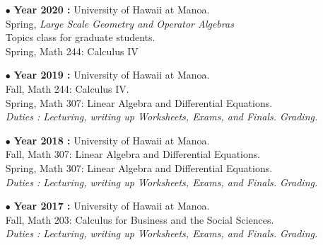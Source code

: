 \documentclass[a4paper,11pt]{article}
\begin{document}
\begin{itemize}

\item[$\bullet$] \textbf{ Year 2020 :} University of Hawaii at Manoa.\\
				Spring, \textit{Large Scale Geometry and Operator Algebras}\\
				Topics class for graduate students.\\
				Spring, Math 244: Calculus IV\\
\item[$\bullet$] \textbf{ Year 2019 :} University of Hawaii at Manoa.\\
					Fall, Math 244: Calculus IV.\\
					Spring, Math 307: Linear Algebra and Differential Equations.\\
					\textit{Duties : Lecturing, writing up Worksheets, Exams, and Finals. Grading.}\\

\item[$\bullet$] \textbf{ Year 2018 :} University of Hawaii at Manoa.\\
					Fall, Math 307: Linear Algebra and Differential Equations.\\
					Spring, Math 307: Linear Algebra and Differential Equations.\\
					\textit{Duties : Lecturing, writing up Worksheets, Exams, and Finals. Grading.}\\

\item[$\bullet$] \textbf{ Year 2017 :} University of Hawaii at Manoa.\\
					Fall, Math 203: Calculus for Business and the Social Sciences.\\
					\textit{Duties : Lecturing, writing up Worksheets, Exams, and Finals. Grading.}\\


\end{itemize}
\end{document}

